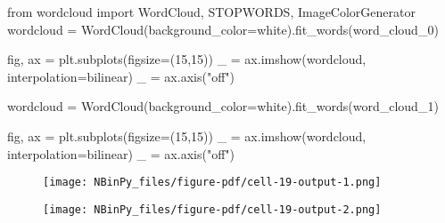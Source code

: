 \documentclass[
  letterpaper,
  DIV=11,
  numbers=noendperiod]{scrartcl}
\newenvironment{Shaded}{\begin{snugshade}}{\end{snugshade}}
\newcommand{\DecValTok}[1]{\textcolor[rgb]{0.68,0.00,0.00}{#1}}
\newcommand{\ImportTok}[1]{\textcolor[rgb]{0.00,0.46,0.62}{#1}}
\newcommand{\NormalTok}[1]{\textcolor[rgb]{0.00,0.23,0.31}{#1}}
\newcommand{\OperatorTok}[1]{\textcolor[rgb]{0.37,0.37,0.37}{#1}}
\newcommand{\StringTok}[1]{\textcolor[rgb]{0.13,0.47,0.30}{#1}}
\begin{document}
\begin{Shaded}
\begin{Highlighting}[]
\ImportTok{from}\NormalTok{ wordcloud }\ImportTok{import}\NormalTok{ WordCloud, STOPWORDS, ImageColorGenerator}
\NormalTok{wordcloud }\OperatorTok{=}\NormalTok{ WordCloud(background\_color}\OperatorTok{=}\StringTok{\textquotesingle{}white\textquotesingle{}}\NormalTok{).fit\_words(word\_cloud\_0)}

\NormalTok{fig, ax }\OperatorTok{=}\NormalTok{ plt.subplots(figsize}\OperatorTok{=}\NormalTok{(}\DecValTok{15}\NormalTok{,}\DecValTok{15}\NormalTok{))}
\NormalTok{\_ }\OperatorTok{=}\NormalTok{ ax.imshow(wordcloud, interpolation}\OperatorTok{=}\StringTok{\textquotesingle{}bilinear\textquotesingle{}}\NormalTok{)}
\NormalTok{\_ }\OperatorTok{=}\NormalTok{ ax.axis(}\StringTok{"off"}\NormalTok{)}




\NormalTok{wordcloud }\OperatorTok{=}\NormalTok{ WordCloud(background\_color}\OperatorTok{=}\StringTok{\textquotesingle{}white\textquotesingle{}}\NormalTok{).fit\_words(word\_cloud\_1)}

\NormalTok{fig, ax }\OperatorTok{=}\NormalTok{ plt.subplots(figsize}\OperatorTok{=}\NormalTok{(}\DecValTok{15}\NormalTok{,}\DecValTok{15}\NormalTok{))}
\NormalTok{\_ }\OperatorTok{=}\NormalTok{ ax.imshow(wordcloud, interpolation}\OperatorTok{=}\StringTok{\textquotesingle{}bilinear\textquotesingle{}}\NormalTok{)}
\NormalTok{\_ }\OperatorTok{=}\NormalTok{ ax.axis(}\StringTok{"off"}\NormalTok{)}
\end{Highlighting}
\end{Shaded}

\begin{figure}[H]

{\centering \texttt{[image: NBinPy\_files/figure-pdf/cell-19-output-1.png]}

}

\end{figure}

\begin{figure}[H]

{\centering \texttt{[image: NBinPy\_files/figure-pdf/cell-19-output-2.png]}

}

\end{figure}
\end{document}
